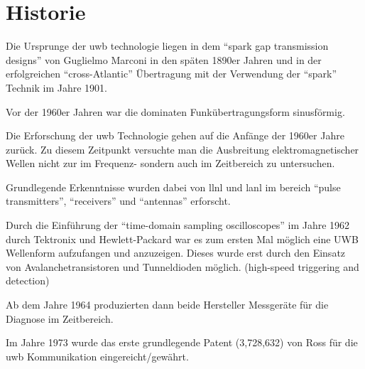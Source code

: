 \begin{comment}
------------------------------------------------------------------------------------------
\end{comment}
\section{Historie}

Die Ursprunge der \ac{uwb} technologie liegen in dem ``spark gap transmission designs'' von Guglielmo Marconi in den späten 1890er Jahren und in der erfolgreichen ``cross-Atlantic'' Übertragung mit der Verwendung der ``spark'' Technik im Jahre 1901. \cite{fontana2004recent}

Vor der 1960er Jahren war die dominaten Funkübertragungsform sinusförmig. \cite{lakkundi2006ultra}

Die Erforschung der \ac{uwb} Technologie gehen auf die Anfänge der 1960er Jahre zurück. Zu diesem Zeitpunkt versuchte man die Ausbreitung elektromagnetischer Wellen nicht zur im Frequenz- sondern auch im Zeitbereich zu untersuchen. \cite{eltaher2004positioning, fontana2004recent, lakkundi2006ultra}

Grundlegende Erkenntnisse wurden dabei von \ac{llnl} und \ac{lanl} im bereich ``pulse transmitters'', ``receivers'' und ``antennas'' erforscht. 

Durch die Einführung der ``time-domain sampling oscilloscopes'' im Jahre 1962 durch Tektronix und Hewlett-Packard war es zum ersten Mal möglich eine UWB Wellenform aufzufangen und anzuzeigen. Dieses wurde erst durch den Einsatz von Avalanchetransistoren und Tunneldioden möglich. (high-speed triggering and detection) \cite{fontana2004recent, lakkundi2006ultra, aiello2006ultra}

Ab dem Jahre 1964 produzierten dann beide Hersteller Messgeräte für die Diagnose im Zeitbereich. \cite{barrett2001technical}

Im Jahre 1973 wurde das erste grundlegende Patent (3,728,632) von Ross für die \ac{uwb} Kommunikation eingereicht/gewährt. \cite{fontana2004recent, barrett2001technical, yang2004uwbcom}
\begin{comment}
US 3728632 A
Transmission and reception system for generating and receiving base-band pulse duration pulse signals without distortion for short base-band communication system
Veröffentlichungsnummer: US3728632 A
Publikationstyp: Erteilung
Veröffentlichungsdatum	: 17. Apr. 1973
Eingetragen: 12. März 1971
Erfinder:	Ross G
Ursprünglich Bevollmächtigter: Sperry Rand Corp
ZUSAMMENFASSUNG
An electromagnetic signal communication system utilizing short base-band pulse signals of sub-nanosecond duration employs dispersionless, broad band antenna transmission line elements for generating and preserving the character of the short base-band pulses in respective transmitter and receiver sub-systems.
\end{comment}

